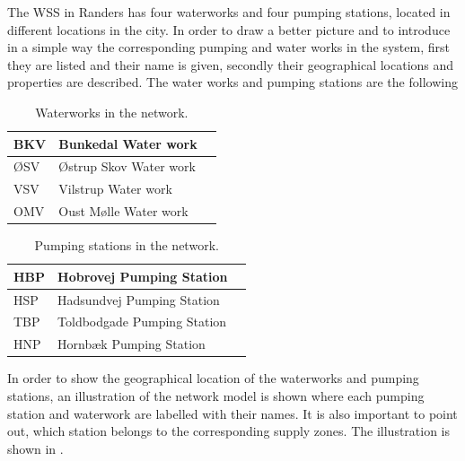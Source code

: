 The WSS in Randers has four waterworks and four pumping stations, located in different locations in the city. In order to draw a better picture and to introduce in a simple way the corresponding pumping and water works in the system, first they are listed and their name is given, secondly their geographical locations and properties are described. The water works and pumping stations are the following

\begin{table}[H]
\begin{center}
    \begin{tabular}{| l | l | l |}
    \hline
    BKV & Bunkedal Water work   \\ \hline
    ØSV & Østrup Skov Water work  \\ \hline
    VSV & Vilstrup Water work  \\ \hline
    OMV & Oust Mølle Water work   \\
    \hline
    \end{tabular}
\end{center}
\vspace{-3mm}
\caption{Waterworks in the network.}
\end{table}

\vspace{-3mm}

\begin{table}[H]
\begin{center}
    \begin{tabular}{| l | l | l |}
    \hline
    HBP & Hobrovej Pumping Station   \\ \hline
    HSP & Hadsundvej Pumping Station  \\ \hline
    TBP & Toldbodgade Pumping Station  \\ \hline
    HNP & Hornbæk Pumping Station   \\
    \hline
    \end{tabular}
\end{center}
\vspace{-3mm}
\caption{Pumping stations in the network.}
\end{table}

\vspace{-3mm}

In order to show the geographical location of the waterworks and pumping stations, an illustration of the network model is shown where each pumping station and waterwork are labelled with their names. It is also important to point out, which station belongs to the corresponding supply zones. The illustration is shown in .

